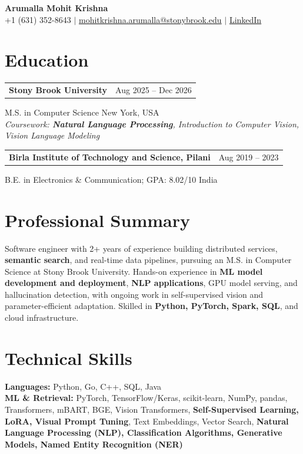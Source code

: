 \documentclass[letterpaper,10pt]{article}
\makeatletter
\newcommand{\entry}[2]{%
  \noindent
  \begin{tabularx}{\linewidth}
    {@{}>{\raggedright\arraybackslash}X@{\hspace{6pt}}r@{}}
    \textbf{#1} & #2
  \end{tabularx}\par
}
\makeatother
\begin{document}
\begin{center}
    {\LARGE\bfseries Arumalla Mohit Krishna}\\[3pt]
    +1 (631) 352-8643 $|$
    \href{mailto:mohitkrishna.arumalla@stonybrook.edu}
    {mohitkrishna.arumalla@stonybrook.edu} $|$
    \href{https://linkedin.com/in/mohit-krishna-arumalla}
    {LinkedIn}
\end{center}
\vspace{-8pt}

\section{Education}

\entry
  {\textbf{Stony Brook University}}
  {Aug 2025 -- Dec 2026}

M.S. in Computer Science \hfill New York, USA\\
\textit{
Coursework: \textbf{Natural Language Processing},
Introduction to Computer Vision, Vision Language Modeling
}
\vspace{3pt}

\entry
  {\textbf{Birla Institute of Technology and Science, Pilani}}
  {Aug 2019 -- 2023}

B.E. in Electronics \& Communication; GPA: 8.02/10 \hfill India
\section{Professional Summary}

Software engineer with 2+ years of experience building distributed services,
\textbf{semantic search}, and real-time data pipelines, pursuing an M.S. in Computer
Science at Stony Brook University. Hands-on experience in \textbf{ML model development and deployment},
\textbf{NLP applications}, GPU model serving, and hallucination detection,
with ongoing work in self-supervised vision and parameter-efficient adaptation.
Skilled in \textbf{Python, PyTorch, Spark, SQL}, and cloud infrastructure.
\section{Technical Skills}

\textbf{Languages:}
Python, Go, C++, SQL, Java\\

\textbf{ML \& Retrieval:}
PyTorch, TensorFlow/Keras, scikit-learn, NumPy, pandas,
Transformers, mBART, BGE, Vision Transformers,
\textbf{Self-Supervised Learning, LoRA, Visual Prompt Tuning},
Text Embeddings, Vector Search,
\textbf{Natural Language Processing (NLP), Classification Algorithms,
Generative Models, Named Entity Recognition (NER)}\\
\end{document}

